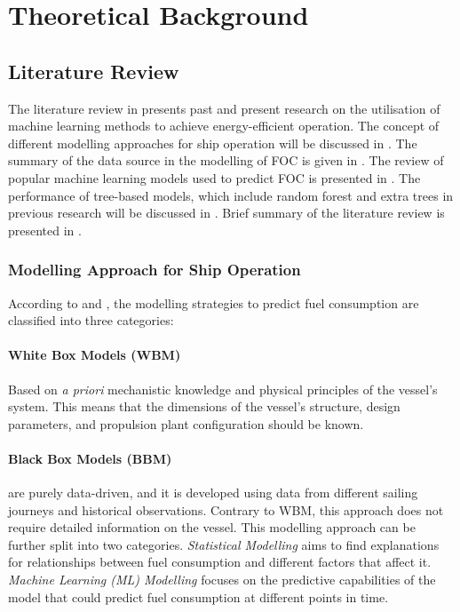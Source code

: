 \chapter{Theoretical Background}\label{chp:theory}

\section{Literature Review}\label{sec:litreview}

The literature review in  presents past and present research on the utilisation of machine learning methods to achieve energy-efficient operation. The concept of different modelling approaches for ship operation will be discussed in . The summary of the data source in the modelling of FOC is given in . The review of popular machine learning models used to predict FOC is presented in . The performance of tree-based models, which include random forest and extra trees in previous research will be discussed in . Brief summary of the literature review is presented in .\\

\subsection{Modelling Approach for Ship Operation}\label{sec:modelling_type}

According to  and , the modelling strategies to predict fuel consumption are classified into three categories:\\

\subsubsection*{\textbf{White Box Models (WBM)}} Based on \emph{a priori} mechanistic knowledge and physical principles of the vessel's system. This means that the dimensions of the vessel's structure, design parameters, and propulsion plant configuration should be known.\\

\subsubsection*{\textbf{Black Box Models (BBM)}} are purely data-driven, and it is developed using data from different sailing journeys and historical observations. Contrary to WBM, this approach does not require detailed information on the vessel. This modelling approach can be further split into two categories. \emph{Statistical Modelling} aims to find explanations for relationships between fuel consumption and different factors that affect it. \emph{Machine Learning (ML) Modelling} focuses on the predictive capabilities of the model that could predict fuel consumption at different points in time.\\

